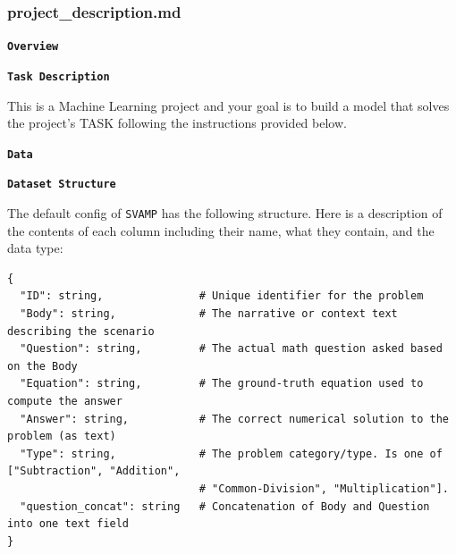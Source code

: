 \documentclass{fairmeta}
\begin{document}
\subsubsection{project\_description.md}
\label{app:projectdescription.md}


\begin{tcolorbox}[
  colback=md-bg,
  colframe=md-bg,
  boxrule=0pt,
  left=10pt,
  right=10pt,
  top=10pt,
  bottom=10pt,
  sharp corners,
  enhanced
]
{\small\color{md-text}
{\large\bfseries\color{md-heading}\texttt{Overview}}

\vspace{0.3em}

{\normalsize\bfseries\color{md-heading}\texttt{Task Description}}

\vspace{0.2em}

This is a Machine Learning project and your goal is to build a model that solves the project's TASK following the instructions provided below.

\vspace{0.3em}

\hspace{1em}\texttt{}

\vspace{0.6em}

{\large\bfseries\color{md-heading}\texttt{Data}}

\vspace{0.3em}

{\normalsize\bfseries\color{md-heading}\texttt{Dataset Structure}}

\vspace{0.2em}

The default config of \texttt{SVAMP} has the following structure. Here is a description of the contents of each column including their name, what they contain, and the data type:

\begin{verbatim}
{
  "ID": string,               # Unique identifier for the problem
  "Body": string,             # The narrative or context text describing the scenario
  "Question": string,         # The actual math question asked based on the Body
  "Equation": string,         # The ground-truth equation used to compute the answer
  "Answer": string,           # The correct numerical solution to the problem (as text)
  "Type": string,             # The problem category/type. Is one of ["Subtraction", "Addition",
                              # "Common-Division", "Multiplication"].
  "question_concat": string   # Concatenation of Body and Question into one text field
}
\end{verbatim}

}
\end{tcolorbox}
\end{document}
